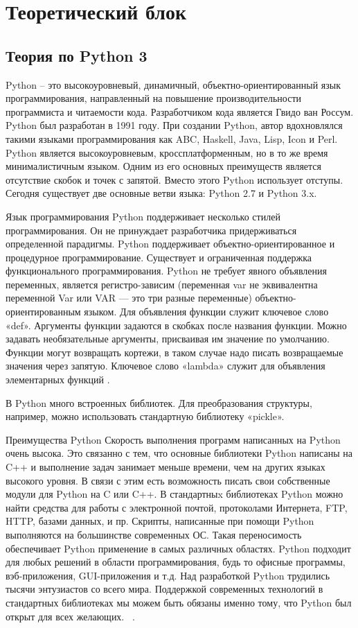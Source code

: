 \documentclass[a4paper,14pt]{extarticle}
\begin{document}
\section{Теоретический блок}
\subsection{Теория по Python 3}
Python – это высокоуровневый, динамичный, объектно-ориентированный язык программирования, направленный на повышение производительности программиста и читаемости кода. Разработчиком кода является Гвидо ван Россум. Python был разработан в 1991 году. При создании Python, автор вдохновлялся такими языками программирования как ABC, Haskell, Java, Lisp, Icon и Perl. Python является высокоуровневым, кроссплатформенным, но в то же время минималистичным языком. Одним из его основных преимуществ является отсутствие скобок и точек с запятой. Вместо этого Python использует отступы. Сегодня существует две основные ветви языка: Python 2.7 и Python 3.x.

Язык программирования Python поддерживает несколько стилей программирования. Он не принуждает разработчика придерживаться определенной парадигмы. Python поддерживает объектно-ориентированное и процедурное программирование. Существует и ограниченная поддержка функционального программирования.
Python не требует явного объявления переменных, является регистро-зависим (переменная var не эквивалентна переменной Var или VAR — это три разные переменные) объектно-ориентированным языком.
Для объявления функции служит ключевое слово «def». Аргументы функции задаются в скобках после названия функции. Можно задавать необязательные аргументы, присваивая им значение по умолчанию. Функции могут возвращать кортежи, в таком случае надо писать возвращаемые значения через запятую. Ключевое слово «lambda» служит для объявления элементарных функций .


В Python много встроенных библиотек. Для преобразования структуры, например, можно использовать стандартную библиотеку «pickle».

Преимущества Python
Скорость выполнения программ написанных на Python очень высока. Это связанно с тем, что основные библиотеки Python написаны на C++ и выполнение задач занимает меньше времени, чем на других языках высокого уровня.
В связи с этим есть возможность писать свои собственные модули для Python на C или C++. В стандартныx библиотеках Python можно найти средства для работы с электронной почтой, протоколами Интернета, FTP, HTTP, базами данных, и пр.
Скрипты, написанные при помощи Python выполняются на большинстве современных ОС. Такая переносимость обеспечивает Python применение в самых различных областях.
Python подходит для любых решений в области программирования, будь то офисные программы, вэб-приложения, GUI-приложения и т.д.
Над разработкой Python трудились тысячи энтузиастов со всего мира. Поддержкой современных технологий в стандартных библиотеках мы можем быть обязаны именно тому, что Python был открыт для всех желающих. ~\cite{justwritepython}.
\end{document}
